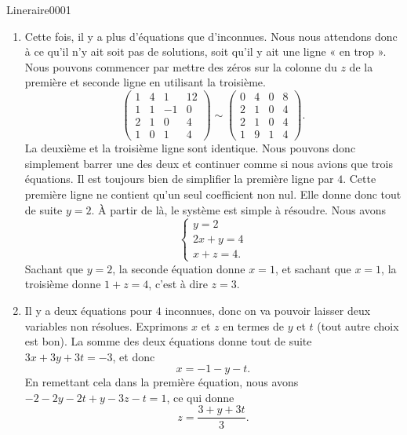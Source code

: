 \begin{corrige}{Lineraire0001}
\begin{enumerate}
\begin{equation}
\begin{array}{cccc|c}
					      0	&	0	&	1	&	3	&	1	
				      \end{array}\right).				      
			\end{equation}
			Sur cette dernière matrice, les solutions se lisent encore plus facilement.
		\item
			Cette fois, il y a plus d'équations que d'inconnues. Nous nous attendons donc à ce qu'il n'y ait soit pas de solutions, soit qu'il y ait une ligne « en trop ». Nous pouvons commencer par mettre des zéros sur la colonne du $z$ de la première et seconde ligne en utilisant la troisième.
			\begin{equation}
				\left(\begin{array}{ccc|c}
					1	&	4	&	1	&	12	\\	
					1	&	1	&	-1	&	0	\\	
						2	&	1	&	0	&	4	\\	
							1	&	0	&	1	&	4	
						\end{array}\right)
						\sim
				\left(\begin{array}{ccc|c}
					0	&	4	&	0	&	8	\\
					2	&	1	&	0	&	4\\
					2	&	1	&	0	&	4\\
					1	&	9	&	1	&	4
				\end{array}\right).
			\end{equation}
			La deuxième et la troisième ligne sont identique. Nous pouvons donc simplement barrer une des deux et continuer comme si nous avions que trois équations. Il est toujours bien de simplifier la première ligne par $4$. Cette première ligne ne contient qu'un seul coefficient non nul. Elle donne donc tout de suite $y=2$. À partir de là, le système est simple à résoudre. Nous avons
			\begin{equation}
				\left\{
				\begin{array}{ll}
					y=2\\
					2x+y=4\\
					x+z=4.
				\end{array}
				\right.
			\end{equation}
			Sachant que $y=2$, la seconde équation donne $x=1$, et sachant que $x=1$, la troisième donne $1+z=4$, c'est à dire $z=3$.

		\item
			Il y a deux équations pour $4$ inconnues, donc on va pouvoir laisser deux variables non résolues. Exprimons $x$ et $z$ en termes de $y$ et $t$ (tout autre choix est bon). La somme des deux équations donne tout de suite $3x+3y+3t=-3$, et donc
			\begin{equation}
				x=-1-y-t.
			\end{equation}
			En remettant cela dans la première équation, nous avons $-2-2y-2t+y-3z-t=1$, ce qui donne
			\begin{equation}
				z=\frac{ 3+y+3t }{ 3 }.
			\end{equation}
	\end{enumerate}

\end{corrige}
